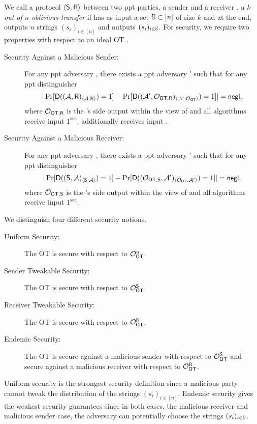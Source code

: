 \begin{definition}
We call a protocol $\langle \mathsf{S},\mathsf{R} \rangle$ between two ppt parties, a sender \send and a receiver \rec, a \emph{$k$ out of $n$ oblivious transfer} if \rec has as input a set $\mathsf{\mathbb S}\subset[n]$ of size $k$ and at the end, \send outputs $n$ strings $(s_i)_{i\in[n]}$ and \rec outputs $(s_i)_{i\in\mathsf{\mathbb S}}$. For security, we require two properties with respect to an ideal OT \OOT.
\begin{description}
\item[Security Against a Malicious Sender:] For any ppt adversary \Adv, there exists a ppt adversary \Adv' such that for any ppt distinguisher \D
$$
|\Pr[\mathsf D((\mathcal{A},\mathsf{R})_{\langle \mathcal{A}, \mathsf{R}\rangle})=1] -\Pr[\mathsf D( (\mathcal{A}', \mathcal O_{\mathsf{OT}, \mathsf{R}})_{\langle \mathcal{A}', \mathcal O_{\mathsf{OT}}\rangle})=1]|=\mathsf{negl},
$$
where $\mathcal O_{\mathsf{OT}, \mathsf{R}}$ is the \rec's side output within the view of \OOT and all algorithms receive input $1^\sec$. \rec additionally receives input \set.
\item[Security Against a Malicious Receiver:] For any ppt adversary \Adv, there exists a ppt adversary \Adv' such that for any ppt distinguisher \D
$$
|\Pr[\mathsf D((\mathsf{S}, \mathcal{A})_{\langle \mathsf{S}, \mathcal{A}\rangle})=1] -\Pr[\mathsf D((\mathcal O_{\mathsf{OT},\mathsf{S}},\mathcal{A}')_{\langle \mathcal O_{\mathsf{OT}} , \mathcal{A}' \rangle})=1]|=\mathsf{negl},
$$
where $\mathcal O_{\mathsf{OT},\mathsf{S}}$ is  the \send's side output within the view of \OOT and all algorithms receive input $1^\sec$.
\end{description}
We distinguish four different security notions.
\begin{description}
\item[Uniform Security:] The OT is secure with respect to $\mathcal O_{\mathsf{OT}}^u$.
\item[Sender Tweakable Security:] The OT is secure with respect to $\mathcal O_{\mathsf{OT}}^{\mathsf{S}}$.
\item[Receiver Tweakable Security:] The OT is secure with respect to $\mathcal O_{\mathsf{OT}}^{\mathsf{R}}$.
\item[Endemic Security:] The OT is secure against a malicious  sender with respect to $\mathcal O_{\mathsf{OT}}^{\mathsf{S}}$ and secure against a malicious receiver with respect to $\mathcal O_{\mathsf{OT}}^{\mathsf{R}}$.
\end{description}
\end{definition}

\begin{remark}
Uniform security is the strongest security definition since a malicious party cannot tweak the distribution of the strings  $(s_i)_{i\in[n]}$. Endemic security gives the weakest security guarantees since in both cases, the malicious receiver and malicious sender case, the adversary can potentially choose the strings $(s_i)_{i\in\mathsf{\mathbb S}}$.
\end{remark}